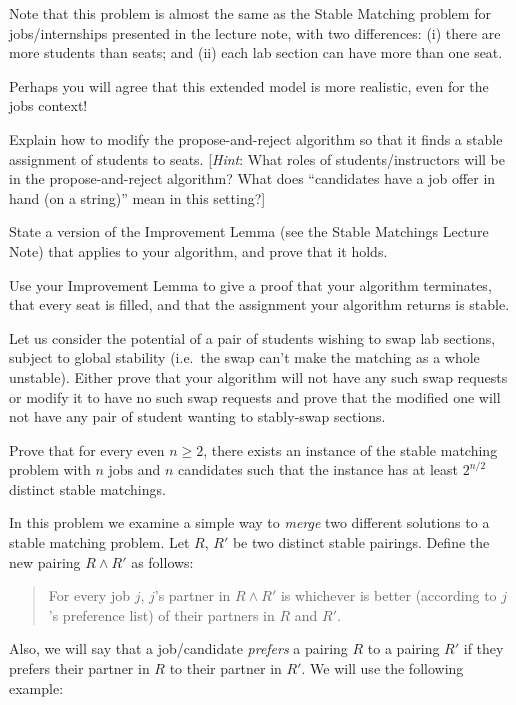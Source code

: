 \documentclass[11pt]{article}
\begin{document}
Note that this problem is almost the same as the Stable Matching
problem for jobs/internships presented in the lecture note, with two differences:
(i) there are more students than seats; and
(ii) each lab section can have more than one seat.

Perhaps you will agree that this extended model is more realistic, even for the jobs context!

\begin{Parts}
\Part Explain how to modify the propose-and-reject algorithm so that 
it finds a stable assignment of students to seats.
[\textit{Hint}: What roles of students/instructors will be in the
propose-and-reject algorithm? What does ``candidates have a job offer
in hand (on a string)'' mean in this setting?]


\Part State a version of the Improvement Lemma (see the Stable
Matchings Lecture Note) 
that applies to your algorithm, and prove that it holds.

\Part Use your Improvement Lemma to give a proof that your algorithm terminates, that every seat is filled, and that the assignment your algorithm returns is stable.

\Part Let us consider the potential of a pair of students wishing to swap lab
sections, subject to global stability (i.e.~the swap can't make the
matching as a whole unstable). Either prove that your algorithm will
not have any such swap requests or modify it to have no such swap
requests and prove that the modified one will not have any pair of student
wanting to stably-swap sections.

\end{Parts}


Prove that for every even $n \geq 2$, there exists an instance of the stable matching problem with $n$ jobs and $n$ candidates such that the instance has at least $2^{n/2}$ distinct stable matchings.


In this problem we examine a simple way to {\em merge} two different
solutions to a stable matching problem. 
Let $R$, $R'$ be two distinct stable pairings.  Define the
new pairing $R \land R'$ as follows: 
\begin{quote}
For every job $j$, $j$'s partner in $R \land R'$ is whichever is better
(according to $j$'s preference list) of their partners in $R$ and $R'$.
\end{quote}
Also, we will say that a job/candidate \textit{prefers} a pairing $R$
to a pairing $R'$ if they prefers their partner in $R$
to their partner in $R'$. We will use the following example:
\end{document}
